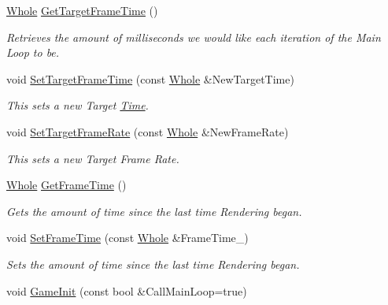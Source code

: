 \begin{DoxyCompactItemize}
\hyperlink{namespacephys_a460f6bc24c8dd347b05e0366ae34f34a}{Whole} \hyperlink{classphys_1_1World_aa063ace52be484c7b03ec5859453f48b}{GetTargetFrameTime} ()
\begin{DoxyCompactList}\small\item\em Retrieves the amount of milliseconds we would like each iteration of the Main Loop to be. \item\end{DoxyCompactList}\item 
void \hyperlink{classphys_1_1World_ad95b5a5ad73e0a05826b5bd834876333}{SetTargetFrameTime} (const \hyperlink{namespacephys_a460f6bc24c8dd347b05e0366ae34f34a}{Whole} \&NewTargetTime)
\begin{DoxyCompactList}\small\item\em This sets a new Target \hyperlink{structphys_1_1Time}{Time}. \item\end{DoxyCompactList}\item 
void \hyperlink{classphys_1_1World_a76dfcde35392291aafd6eb1a64b3c95c}{SetTargetFrameRate} (const \hyperlink{namespacephys_a460f6bc24c8dd347b05e0366ae34f34a}{Whole} \&NewFrameRate)
\begin{DoxyCompactList}\small\item\em This sets a new Target Frame Rate. \item\end{DoxyCompactList}\item 
\hyperlink{namespacephys_a460f6bc24c8dd347b05e0366ae34f34a}{Whole} \hyperlink{classphys_1_1World_a348cebf8f15202a9916ac1b2400c63b1}{GetFrameTime} ()
\begin{DoxyCompactList}\small\item\em Gets the amount of time since the last time Rendering began. \item\end{DoxyCompactList}\item 
void \hyperlink{classphys_1_1World_a0168122baeb30d4b90ddecdda46c8fea}{SetFrameTime} (const \hyperlink{namespacephys_a460f6bc24c8dd347b05e0366ae34f34a}{Whole} \&FrameTime\_\-)
\begin{DoxyCompactList}\small\item\em Sets the amount of time since the last time Rendering began. \item\end{DoxyCompactList}\item 
void \hyperlink{classphys_1_1World_a21cc36be08a61f40619584d4c438936b}{GameInit} (const bool \&CallMainLoop=true)

\end{DoxyCompactItemize}
